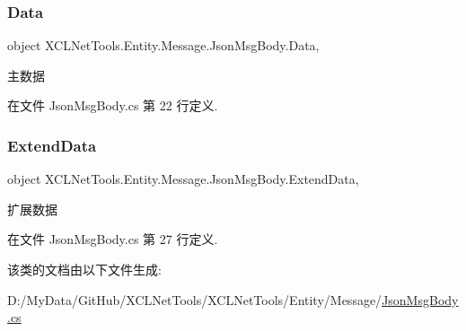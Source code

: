 \subsubsection{\texorpdfstring{Data}{Data}}
{\footnotesize\ttfamily object X\+C\+L\+Net\+Tools.\+Entity.\+Message.\+Json\+Msg\+Body.\+Data\hspace{0.3cm}{\ttfamily [get]}, {\ttfamily [set]}}



主数据 



在文件 Json\+Msg\+Body.\+cs 第 22 行定义.

\mbox{\label{class_x_c_l_net_tools_1_1_entity_1_1_message_1_1_json_msg_body_a0382629d68979ea8a39383a1d9891ab7}} 
\subsubsection{\texorpdfstring{Extend\+Data}{ExtendData}}
{\footnotesize\ttfamily object X\+C\+L\+Net\+Tools.\+Entity.\+Message.\+Json\+Msg\+Body.\+Extend\+Data\hspace{0.3cm}{\ttfamily [get]}, {\ttfamily [set]}}



扩展数据 



在文件 Json\+Msg\+Body.\+cs 第 27 行定义.



该类的文档由以下文件生成\+:\begin{DoxyCompactItemize}
\item 
D\+:/\+My\+Data/\+Git\+Hub/\+X\+C\+L\+Net\+Tools/\+X\+C\+L\+Net\+Tools/\+Entity/\+Message/\hyperlink{_json_msg_body_8cs}{Json\+Msg\+Body.\+cs}\end{DoxyCompactItemize}
